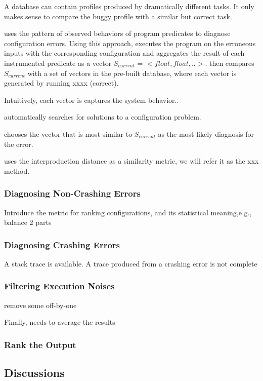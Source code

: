A database can contain profiles produced by dramatically
different tasks. It only makes sense to compare the buggy profile
with a similar but correct task.

\ourtool uses the pattern of observed behaviors of program predicates
to diagnose configuration errors. Using this approach, \ourtool
executes the program on the erroneous inputs with the
corresponding configuration and aggregates the result of
each instrumented predicate as a vector $S_{current}$ = $<float, float, ..>$.
\ourtool then compares $S_{current}$ with a set of
vectors in the pre-built database, where each vector is generated
by running xxxx (correct).

Intuitively, each vector is captures the system behavior..

\ourtool automatically searches for solutions to a configuration
problem.

\ourtool chooses the vector that is most similar to $S_{current}$ as
the most likely diagnosis for the error.

\ourtool uses the interproduction distance as a similarity metric, we will
refer it as the xxx method.


\subsubsection{Diagnosing Non-Crashing Errors}

Introduce the metric for ranking configurations, and its
statistical meaning,e g., balance 2 parts

\subsubsection{Diagnosing Crashing Errors}

A stack trace is available. A trace produced from a crashing error is not complete

\subsubsection{Filtering Execution Noises}

remove some off-by-one


Finally, needs to average the results
\subsubsection{Rank the Output}

\subsection{Discussions}

